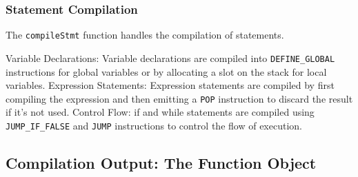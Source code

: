 \subsubsection{Statement Compilation}

The \texttt{compileStmt} function handles the compilation of statements.

Variable Declarations: Variable declarations are compiled into \texttt{DEFINE\_GLOBAL} instructions for global 
variables or by allocating a slot on the stack for local variables.
Expression Statements: Expression statements are compiled by first compiling the expression and then emitting a \texttt{POP} instruction to discard the result if it's not used.
Control Flow: if and while statements are compiled using \texttt{JUMP\_IF\_FALSE} and \texttt{JUMP} instructions 
to control the flow of execution.

\subsection{Compilation Output: The Function Object}
\label{subsec:compilation-output}

